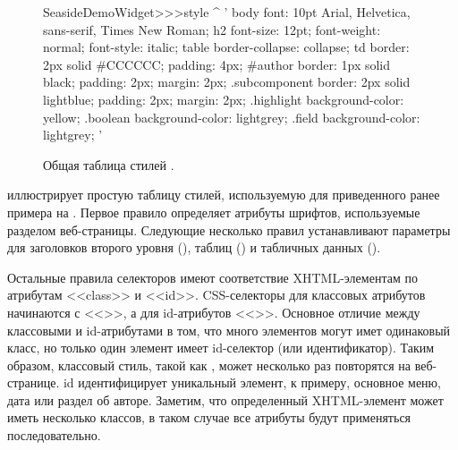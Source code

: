 \documentclass[a4paper,10pt,twoside]{book}
\begin{document}
\begin{figure}[tb]
\begin{code}{}
SeasideDemoWidget>>>style
	^ '
body {
	font: 10pt Arial, Helvetica, sans-serif, Times New Roman;
}
h2 {
	font-size: 12pt;
	font-weight: normal;
	font-style: italic;
}
table { border-collapse: collapse; }
td {
	border: 2px solid #CCCCCC;
	padding: 4px;
}
#author {
	border: 1px solid black;
	padding: 2px;
	margin: 2px;
}
.subcomponent {
	border: 2px solid lightblue;
	padding: 2px;
	margin: 2px;
}
.highlight { background-color: yellow; }
.boolean { background-color: lightgrey; }
.field { background-color: lightgrey; }
'
\end{code}
\caption{Общая таблица стилей .
}
\end{figure}


 иллюстрирует простую таблицу стилей,
используемую для приведенного ранее примера на .
Первое правило определяет атрибуты шрифтов,
используемые разделом  веб-страницы.
Следующие несколько правил устанавливают параметры
для заголовков второго уровня (), таблиц () и
табличных данных (). 


Остальные правила селекторов имеют соответствие XHTML-элементам по
атрибутам <<class>> и <<id>>.
CSS-селекторы для классовых атрибутов начинаются с <<>>,
а для id-атрибутов <<\ct{#}>>.
Основное отличие между классовыми и id-атрибутами в том,
что много элементов могут имет одинаковый класс,
но только один элемент имеет id-селектор (или идентификатор).
Таким образом, классовый стиль, такой как ,
может несколько раз повторятся на веб-странице.
id идентифицирует уникальный элемент, к примеру,
основное меню, дата или раздел об авторе.
Заметим, что определенный XHTML-элемент может иметь несколько классов,
в таком случае все атрибуты будут применяться последовательно.
\end{document}
